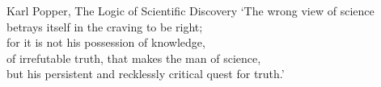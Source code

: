 \documentclass{Latex/Classes/GenThesis}
\begin{document}


\fancyend

\thispagestyle{empty}
\newpage

\vspace*{3cm} 

\begin{pquotation}{Karl Popper, The Logic of Scientific Discovery}
	`The wrong view of science\\
	 betrays itself in the craving to be right;\\ 
	for it is not his possession of knowledge,\\ 
	of irrefutable truth, that makes the man of science, \\
	but his persistent and recklessly critical quest for truth.'\\
	\newline
\end{pquotation}

%
\fancyend

\fancyend

{}


\fancyend

{}
\setcounter{secnumdepth}{3} %
\setcounter{tocdepth}{3}    %
\tableofcontents            %
\fancyend





%  
\end{document}
